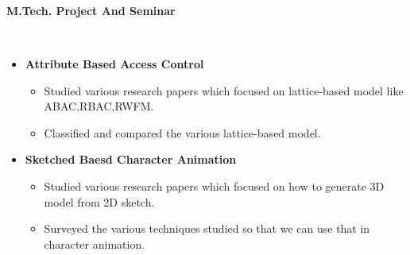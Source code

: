 \documentclass[a4paper,10pt]{article}
\newcommand{\isep}{-2 pt}
\newcommand{\lsep}{-0.5cm}
\newcommand{\resheading}[1]{{\small \colorbox{mygrey}{\begin{minipage}{0.975\textwidth}{\textbf{#1 \vphantom{p\^{E}}}}\end{minipage}}}}
\begin{document}
\hspace{0.5cm}\\
\hspace{0.5cm}\\
\hspace{0.5cm}\\
\hspace{0.5cm}\\
\hspace{0.5cm}\\
\hspace{0.5cm}\\
\hspace{0.5cm}\\
\hspace{0.5cm}\\
\hspace{0.5cm}\\
\hspace{0.5cm}\\
\hspace{0.5cm}\\
\hspace{0.5cm}\\
\hspace{0.5cm}\\
\hspace{0.5cm}\\
\hspace{0.5cm}\\[-0.2cm]

\resheading{\textbf{\large M.Tech. Project And Seminar} }\\[\lsep]
\begin{itemize}
\item \textbf { Attribute Based Access Control}
	\begin{itemize}\itemsep \isep
	\item Studied various research papers which focused on lattice-based model like ABAC,RBAC,RWFM.
	\item  Classified and compared the various lattice-based model. 

	\end{itemize}

\end{itemize}
\begin{itemize}
\item \textbf{ Sketched Baesd Character Animation}
	\begin{itemize}\itemsep \isep
	\item Studied various research papers which focused on how to generate 3D model from 2D sketch.
 	\item Surveyed  the various  techniques studied  so that we can use that in character animation.

	\end{itemize}
\end{itemize}
\end{document}

